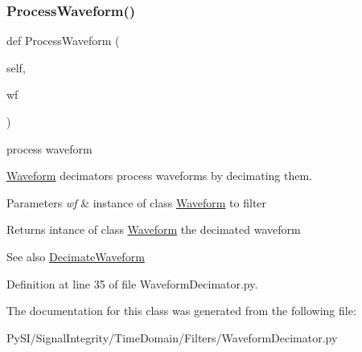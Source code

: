 \subsubsection{\texorpdfstring{Process\+Waveform()}{ProcessWaveform()}}
{\footnotesize\ttfamily def Process\+Waveform (\begin{DoxyParamCaption}\item[{}]{self,  }\item[{}]{wf }\end{DoxyParamCaption})}



process waveform 

\hyperlink{namespaceSignalIntegrity_1_1TimeDomain_1_1Waveform}{Waveform} decimators process waveforms by decimating them.


\begin{DoxyParams}{Parameters}
{\em wf} & instance of class \hyperlink{namespaceSignalIntegrity_1_1TimeDomain_1_1Waveform}{Waveform} to filter \\
\hline
\end{DoxyParams}
\begin{DoxyReturn}{Returns}
intance of class \hyperlink{namespaceSignalIntegrity_1_1TimeDomain_1_1Waveform}{Waveform} the decimated waveform 
\end{DoxyReturn}
\begin{DoxySeeAlso}{See also}
\hyperlink{classSignalIntegrity_1_1TimeDomain_1_1Filters_1_1WaveformDecimator_1_1WaveformDecimator_af90fbe6c62fc6e0c9c21732e9c094a9a}{Decimate\+Waveform} 
\end{DoxySeeAlso}


Definition at line 35 of file Waveform\+Decimator.\+py.



The documentation for this class was generated from the following file\+:\begin{DoxyCompactItemize}
\item 
Py\+S\+I/\+Signal\+Integrity/\+Time\+Domain/\+Filters/Waveform\+Decimator.\+py\end{DoxyCompactItemize}
